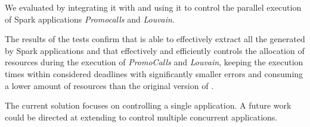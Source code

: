We evaluated \dSymb by integrating it with \cSpark and using it to control the parallel execution of Spark applications \textit{Promocalls} and \textit{Louvain}. 


The results of the tests confirm that \approach is able to effectively extract all the \plans generated by Spark applications and that \tool effectively and efficiently controls the allocation of resources during the execution of \textit{PromoCalls} and \textit{Louvain}, keeping the execution times within considered deadlines with significantly smaller errors and consuming a lower amount of resources than the original version of \cSpark.


The current solution focuses on controlling a single application. A future work could be directed at extending \tool to control multiple concurrent applications.




